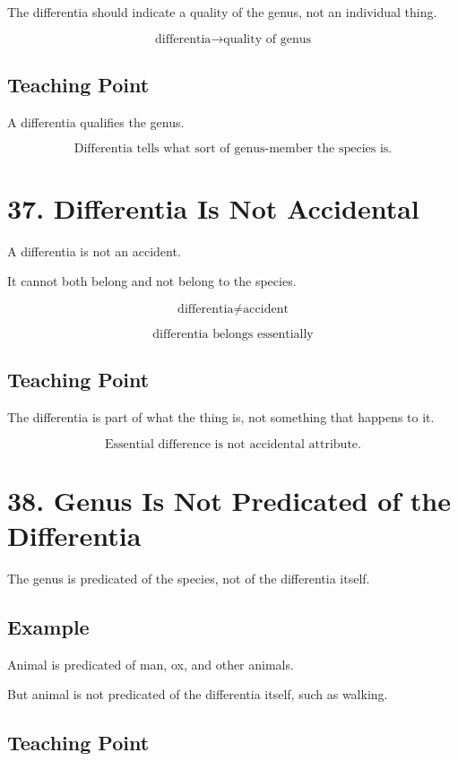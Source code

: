 \documentclass[12pt]{article}
\begin{document}
The differentia should indicate a quality of the genus, not an individual thing.

\[
\text{differentia} \rightarrow \text{quality of genus}
\]

\subsection*{Teaching Point}

A differentia qualifies the genus.

\[
\boxed{
\text{Differentia tells what sort of genus-member the species is.}
}
\]

\section*{37. Differentia Is Not Accidental}

A differentia is not an accident.

It cannot both belong and not belong to the species.

\[
\text{differentia} \neq \text{accident}
\]

\[
\text{differentia belongs essentially}
\]

\subsection*{Teaching Point}

The differentia is part of what the thing is, not something that happens to it.

\[
\boxed{
\text{Essential difference is not accidental attribute.}
}
\]

\section*{38. Genus Is Not Predicated of the Differentia}

The genus is predicated of the species, not of the differentia itself.

\subsection*{Example}

Animal is predicated of man, ox, and other animals.

But animal is not predicated of the differentia itself, such as walking.

\subsection*{Teaching Point}
\end{document}
